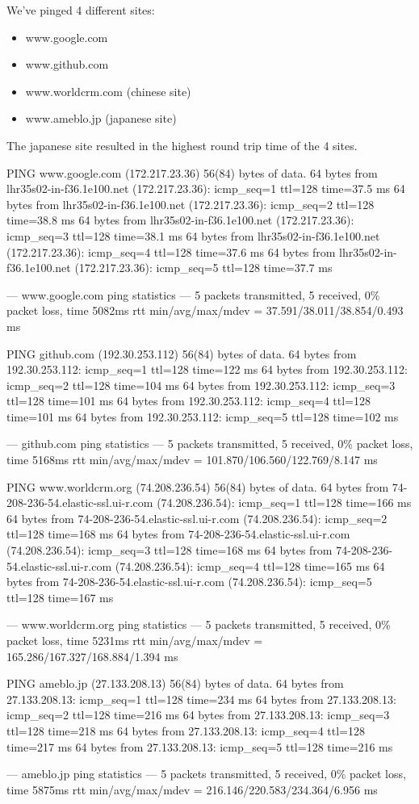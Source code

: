 We've pinged 4 different sites:
\begin{itemize}
	\item www.google.com
	\item www.github.com
	\item www.worldcrm.com (chinese site)
	\item www.ameblo.jp (japanese site)
\end{itemize}
The japanese site resulted in the highest round trip time of the 4 sites.


PING www.google.com (172.217.23.36) 56(84) bytes of data.
64 bytes from lhr35s02-in-f36.1e100.net (172.217.23.36): icmp_seq=1 ttl=128 time=37.5 ms
64 bytes from lhr35s02-in-f36.1e100.net (172.217.23.36): icmp_seq=2 ttl=128 time=38.8 ms
64 bytes from lhr35s02-in-f36.1e100.net (172.217.23.36): icmp_seq=3 ttl=128 time=38.1 ms
64 bytes from lhr35s02-in-f36.1e100.net (172.217.23.36): icmp_seq=4 ttl=128 time=37.6 ms
64 bytes from lhr35s02-in-f36.1e100.net (172.217.23.36): icmp_seq=5 ttl=128 time=37.7 ms

--- www.google.com ping statistics ---
5 packets transmitted, 5 received, 0\% packet loss, time 5082ms
rtt min/avg/max/mdev = 37.591/38.011/38.854/0.493 ms


PING github.com (192.30.253.112) 56(84) bytes of data.
64 bytes from 192.30.253.112: icmp_seq=1 ttl=128 time=122 ms
64 bytes from 192.30.253.112: icmp_seq=2 ttl=128 time=104 ms
64 bytes from 192.30.253.112: icmp_seq=3 ttl=128 time=101 ms
64 bytes from 192.30.253.112: icmp_seq=4 ttl=128 time=101 ms
64 bytes from 192.30.253.112: icmp_seq=5 ttl=128 time=102 ms

--- github.com ping statistics ---
5 packets transmitted, 5 received, 0\% packet loss, time 5168ms
rtt min/avg/max/mdev = 101.870/106.560/122.769/8.147 ms


PING www.worldcrm.org (74.208.236.54) 56(84) bytes of data.
64 bytes from 74-208-236-54.elastic-ssl.ui-r.com (74.208.236.54): icmp_seq=1 ttl=128 time=166 ms
64 bytes from 74-208-236-54.elastic-ssl.ui-r.com (74.208.236.54): icmp_seq=2 ttl=128 time=168 ms
64 bytes from 74-208-236-54.elastic-ssl.ui-r.com (74.208.236.54): icmp_seq=3 ttl=128 time=168 ms
64 bytes from 74-208-236-54.elastic-ssl.ui-r.com (74.208.236.54): icmp_seq=4 ttl=128 time=165 ms
64 bytes from 74-208-236-54.elastic-ssl.ui-r.com (74.208.236.54): icmp_seq=5 ttl=128 time=167 ms

--- www.worldcrm.org ping statistics ---
5 packets transmitted, 5 received, 0\% packet loss, time 5231ms
rtt min/avg/max/mdev = 165.286/167.327/168.884/1.394 ms


PING ameblo.jp (27.133.208.13) 56(84) bytes of data.
64 bytes from 27.133.208.13: icmp_seq=1 ttl=128 time=234 ms
64 bytes from 27.133.208.13: icmp_seq=2 ttl=128 time=216 ms
64 bytes from 27.133.208.13: icmp_seq=3 ttl=128 time=218 ms
64 bytes from 27.133.208.13: icmp_seq=4 ttl=128 time=217 ms
64 bytes from 27.133.208.13: icmp_seq=5 ttl=128 time=216 ms

--- ameblo.jp ping statistics ---
5 packets transmitted, 5 received, 0\% packet loss, time 5875ms
rtt min/avg/max/mdev = 216.146/220.583/234.364/6.956 ms
